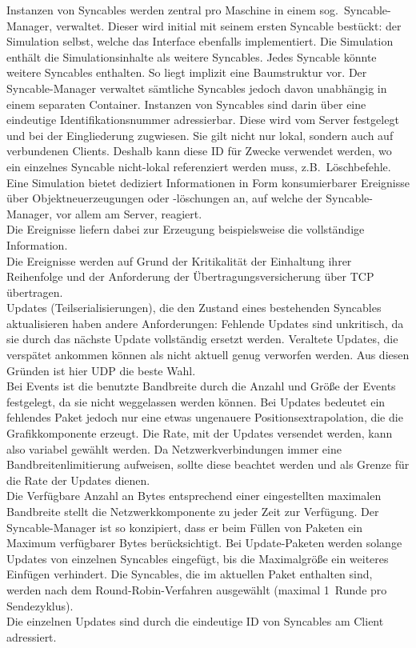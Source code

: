 Instanzen von Syncables werden zentral pro Maschine in einem sog.~Syncable-Manager, verwaltet. 
Dieser wird initial mit seinem ersten Syncable bestückt: der Simulation selbst, welche das Interface ebenfalls implementiert. Die Simulation enthält die Simulationsinhalte als weitere Syncables. Jedes Syncable könnte weitere Syncables enthalten. So liegt implizit eine Baumstruktur vor. Der Syncable-Manager verwaltet sämtliche Syncables jedoch davon unabhängig in einem separaten Container. Instanzen von Syncables sind darin über eine eindeutige Identifikationsnummer adressierbar. Diese wird vom Server festgelegt und bei der Eingliederung zugwiesen. Sie gilt nicht nur lokal, sondern auch auf verbundenen Clients. Deshalb kann diese ID für Zwecke verwendet werden, wo ein einzelnes Syncable nicht-lokal referenziert werden muss, z.B.~Löschbefehle.\\%
Eine Simulation bietet dediziert Informationen in Form konsumierbarer Ereignisse über Objektneuerzeugungen oder -löschungen an, auf welche der Syncable-Manager, vor allem am Server, reagiert.\\
Die Ereignisse liefern dabei zur Erzeugung beispielsweise die vollständige Information.\\
Die Ereignisse werden auf Grund der Kritikalität der Einhaltung ihrer Reihenfolge und der Anforderung der Übertragungsversicherung über TCP übertragen.\\
Updates (Teilserialisierungen), die den Zustand eines bestehenden Syncables aktualisieren haben andere Anforderungen: Fehlende Updates sind unkritisch, da sie durch das nächste Update vollständig ersetzt werden. Veraltete Updates, die verspätet ankommen können als nicht aktuell genug verworfen werden. Aus diesen Gründen ist hier UDP die beste Wahl.\\
Bei Events ist die benutzte Bandbreite durch die Anzahl und Größe der Events festgelegt, da sie nicht weggelassen werden können. Bei Updates bedeutet ein fehlendes Paket jedoch nur eine etwas ungenauere Positionsextrapolation, die die Grafikkomponente erzeugt. Die Rate, mit der Updates versendet werden, kann also variabel gewählt werden. Da Netzwerkverbindungen immer eine Bandbreitenlimitierung aufweisen, sollte diese beachtet werden und als Grenze für die Rate der Updates dienen.\\
Die Verfügbare Anzahl an Bytes entsprechend einer eingestellten maximalen Bandbreite stellt die Netzwerkkomponente zu jeder Zeit zur Verfügung.
Der Syncable-Manager ist so konzipiert, dass er beim Füllen von Paketen ein Maximum verfügbarer Bytes berücksichtigt.
Bei Update-Paketen werden solange Updates von einzelnen Syncables eingefügt, bis die Maximalgröße ein weiteres Einfügen verhindert. Die Syncables, die im aktuellen Paket enthalten sind, werden nach dem Round-Robin-Verfahren ausgewählt (maximal 1~Runde pro Sendezyklus).\\
Die einzelnen Updates sind durch die eindeutige ID von Syncables am Client adressiert.


